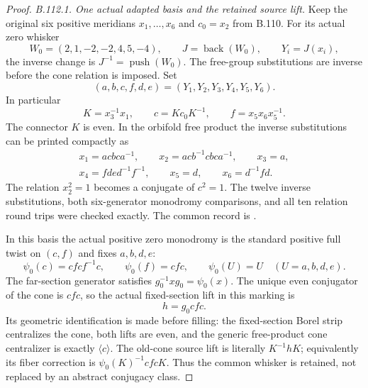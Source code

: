 \begin{proof}
\emph{B.112.1. One actual adapted basis and the retained source lift.}
Keep the original six positive meridians $x_1,\ldots,x_6$ and
$c_0=x_2$ from B.110. For its actual zero whisker
\[
 W_0=(2,1,-2,-2,4,5,-4),\qquad
 J=\operatorname{back}(W_0),\qquad Y_i=J(x_i),
\]
the inverse change is $J^{-1}=\operatorname{push}(W_0)$.
The free-group substitutions are inverse before the cone relation
is imposed. Set
\[
 (a,b,c,f,d,e)=(Y_1,Y_2,Y_3,Y_4,Y_5,Y_6).
\]
In particular
\begin{equation}\label{eq:B112-cone-connector}
 K=x_3^{-1}x_1,\qquad c=Kc_0K^{-1},\qquad
 f=x_5x_6x_5^{-1}.
\end{equation}
The connector $K$ is even. In the orbifold free product the inverse
substitutions can be printed compactly as
\begin{equation}\label{eq:B112-inverse-basis}
 \begin{gathered}
 x_1=acbc a^{-1},\qquad x_2=acb^{-1}cbc a^{-1},\qquad x_3=a,\\
 x_4=fde d^{-1}f^{-1},\qquad x_5=d,\qquad x_6=d^{-1}fd.
 \end{gathered}
\end{equation}
The relation $x_2^2=1$ becomes a conjugate of $c^2=1$.
The twelve inverse substitutions, both six-generator monodromy
comparisons, and all ten relation round trips were checked exactly.
The common record is
.

In this basis the actual positive zero monodromy is the standard
positive full twist on $(c,f)$ and fixes $a,b,d,e$:
\[
 \psi_0(c)=cfcf^{-1}c,\qquad \psi_0(f)=cfc,
 \qquad \psi_0(U)=U\quad(U=a,b,d,e).
\]
The far-section generator satisfies $g_0^{-1}xg_0=\psi_0(x)$.
The unique even conjugator of the cone is $cfc$, so the actual
fixed-section lift in this marking is
\begin{equation}\label{eq:B112-source-h}
 h=g_0cfc.
\end{equation}
Its geometric identification is made before filling: the fixed-section
Borel strip centralizes the cone, both lifts are even, and the
generic free-product cone centralizer is exactly $\langle c\rangle$.
The old-cone source lift is literally $K^{-1}hK$; equivalently its
fiber correction is $\psi_0(K)^{-1}cfcK$. Thus the common whisker
is retained, not replaced by an abstract conjugacy class.


\end{proof}
